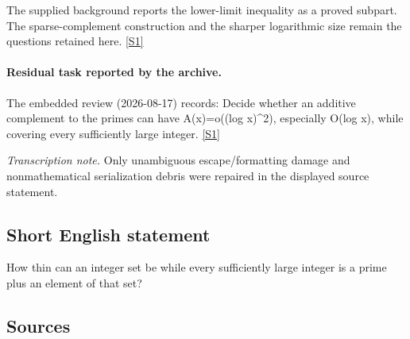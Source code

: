 \documentclass[11pt,a4paper]{article}
\newcommand{\sref}[2]{\hyperlink{source:#1:#2}{[S#2]}}
\begin{document}
The supplied background reports the lower-limit inequality as a proved subpart. The sparse-complement construction and the sharper logarithmic size remain the questions retained here. \sref{statement}{1}

\paragraph{Residual task reported by the archive.}

The embedded review (2026-08-17) records: Decide whether an additive complement to the primes can have A(x)=o((log x)\textasciicircum{}2), especially O(log x), while covering every sufficiently large integer. \sref{statement}{1}

{\small\emph{Transcription note.} Only unambiguous escape/formatting damage and nonmathematical serialization debris were repaired in the displayed source statement.}

\subsection{Short English statement}

How thin can an integer set be while every sufficiently large integer is a prime plus an element of that set?

\subsection{Sources}
\end{document}
